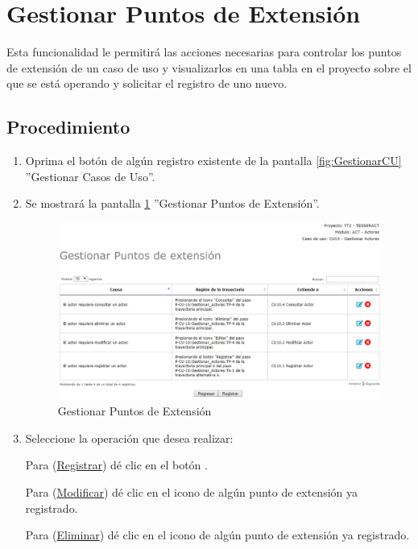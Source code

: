 \hypertarget{cv:GestionarPExt}{\section{Gestionar Puntos de Extensión}} \label{sec:GestionarPExt}

	Esta funcionalidad le permitirá las acciones necesarias para controlar los puntos de extensión de un caso de uso y visualizarlos en una tabla en el proyecto sobre el que se está operando y solicitar el registro de uno nuevo.

		\subsection{Procedimiento}

			\begin{enumerate}
			
			\item Oprima el botón \IUPext{} de algún registro existente de la pantalla \ref{fig:GestionarCU} ''Gestionar Casos de Uso''.
	
			\item Se mostrará la pantalla \ref{fig:GestionarPuntosExt} ''Gestionar Puntos de Extensión''.

			\begin{figure}[htbp!]
				\begin{center}
					\includegraphics[scale=0.6]{roles/lider/puntosExtension/pantallas/IU6-1-4gestionarPuntosExt}
					\caption{Gestionar Puntos de Extensión}
					\label{fig:GestionarPuntosExt}
				\end{center}
			\end{figure}
		
				\item Seleccione la operación que desea realizar:
			
			Para (\hyperlink{cv:registrarPExt}{Registrar}) dé clic en el botón \IURegistrar.
			
			Para (\hyperlink{cv:modificarPExt}{Modificar}) dé clic en el icono \IUEditar{} de algún punto de extensión ya registrado.
			
			Para (\hyperlink{cv:eliminarPExt}{Eliminar}) dé clic en el icono \IUBotonEliminar{} de algún punto de extensión ya registrado.
			
			\end{enumerate}